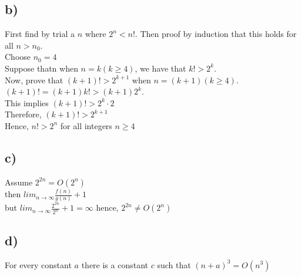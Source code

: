 \documentclass[a4paper,11pt,twoside]{article}
\begin{document}
\subsection*{b)}
First find by trial a $n$ where $2^{n} < n!$. Then proof by induction that this holds for all $n > n_{0}$.\\
Choose $n_{0} = 4$\\
Suppose thatn when $n = k(k \geq 4)$, we have that $k! > 2^{k}$.\\
Now, prove that $(k + 1)! > 2^{k+1}$ when $n = (k + 1)(k \geq 4)$.\\
$(k + 1)! = (k + 1)k! > (k + 1)2^{k}$.\\
This implies $(k+1)! > 2^{k} \cdot 2$\\
Therefore, $(k + 1)! > 2^{k+1}$\\
Hence, $n! > 2^{n}$ for all integers $n \geq 4$\\

\subsection*{c)} 
Assume $2^{2n} = O(2^{n})$\\
then $lim_{n \to \infty} \frac{f(n)}{g(n)}+1$\\
but $lim_{n \to \infty} \frac{2^{2n}}{2^{n}} + 1 = \infty$
hence, $2^{2n} \neq O(2^{n})$\\

\subsection*{d)}
For every constant $a$ there is a constant $c$ such that $(n + a)^{3} = O(n^{3})$ 






\end{document}
